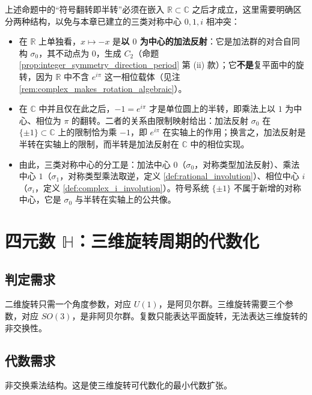 \begin{remark}\label{rem:sign_versus_additive_reflection}
上述命题中的“符号翻转即半转”必须在嵌入 $\mathbb{R}\subset\mathbb{C}$ 之后才成立，这里需要明确区分两种结构，以免与本章已建立的三类对称中心 $0,1,i$ 相冲突：
\begin{itemize}
    \item 在 $\mathbb{R}$ 上单独看，$x\mapsto-x$ 是\textbf{以 $0$ 为中心的加法反射}：它是加法群的对合自同构 $\sigma_0$，其不动点为 $0$，生成 $C_2$（命题 \ref{prop:integer_symmetry_direction_period} 第 (ii) 款）；它\textbf{不是}复平面中的旋转，因为 $\mathbb{R}$ 中不含 $e^{i\pi}$ 这一相位载体（见注 \ref{rem:complex_makes_rotation_algebraic}）。
    \item 在 $\mathbb{C}$ 中并且仅在此之后，$-1=e^{i\pi}$ 才是单位圆上的半转，即乘法上以 $1$ 为中心、相位为 $\pi$ 的翻转。二者的关系由限制映射给出：加法反射 $\sigma_0$ 在 $\{\pm1\}\subset\mathbb{C}$ 上的限制恰为乘 $-1$，即 $e^{i\pi}$ 在实轴上的作用；换言之，加法反射是半转在实轴上的限制，而半转是加法反射在 $\mathbb{C}$ 中的相位实现。
    \item 由此，三类对称中心的分工是：加法中心 $0$（$\sigma_0$，对称类型加法反射）、乘法中心 $1$（$\sigma_1$，对称类型乘法取逆，定义 \ref{def:rational_involution}）、相位中心 $i$（$\sigma_i$，定义 \ref{def:complex_i_involution}）。符号系统 $\{\pm1\}$ 不属于新增的对称中心，它是 $\sigma_0$ 与半转在实轴上的公共像。
\end{itemize}
\end{remark}

\section{\texorpdfstring{四元数 $\mathbb{H}$：三维旋转周期的代数化}{四元数 H：三维旋转周期的代数化}}

\subsection{\texorpdfstring{判定需求}{判定需求}}

二维旋转只需一个角度参数，对应 $U(1)$，是阿贝尔群。三维旋转需要三个参数，对应 $SO(3)$，是非阿贝尔群。复数只能表达平面旋转，无法表达三维旋转的非交换性。

\subsection{\texorpdfstring{代数需求}{代数需求}}

非交换乘法结构。这是使三维旋转可代数化的最小代数扩张。

